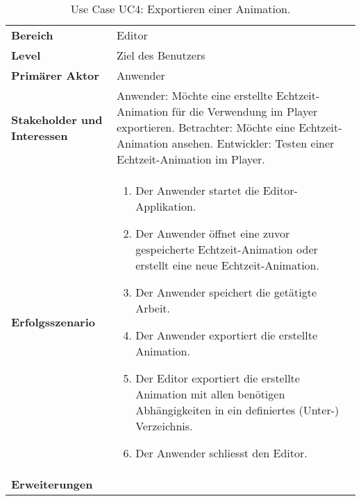
\begin{table}[H]
    \centering
    \caption{Use Case UC4: Exportieren einer Animation.}\label{table:uc4-export-demo}
    \begin{tabular}{p{}p{}}
        \toprule
            \textbf{Bereich} &
            Editor \\
        \cmidrule(r){1-1}\cmidrule(lr){2-2}
            \textbf{Level} &
            Ziel des Benutzers \\
        \cmidrule(r){1-1}\cmidrule(lr){2-2}
            \textbf{Primärer Aktor} &
            Anwender \\
        \cmidrule(r){1-1}\cmidrule(lr){2-2}
            \textbf{Stakeholder und Interessen} &
            Anwender: Möchte eine erstellte Echtzeit-Animation für die
            Verwendung im Player exportieren. \newline
            Betrachter: Möchte eine Echtzeit-Animation ansehen. \newline
            Entwickler: Testen einer Echtzeit-Animation im Player. \\
        \cmidrule(r){1-1}\cmidrule(lr){2-2}
            \textbf{Erfolgsszenario} &
            \begin{enumerate}
                \item{Der Anwender startet die Editor-Applikation.}
                    \item{Der Anwender öffnet eine zuvor gespeicherte
                            Echtzeit-Animation oder erstellt eine neue
                            Echtzeit-Animation.}
                \item{Der Anwender speichert die getätigte Arbeit.}
                \item{Der Anwender exportiert die erstellte Animation.}
                \item{Der Editor exportiert die erstellte Animation mit allen
                        benötigen Abhängigkeiten in ein definiertes (Unter-)
                        Verzeichnis.}
                \item{Der Anwender schliesst den Editor.}
            \end{enumerate} \\
        \cmidrule(r){1-1}\cmidrule(lr){2-2}
            \textbf{Erweiterungen} &
            \begin{enumerate}[label= (\alph*)]

\end{enumerate}
\end{tabular}
\end{table}
